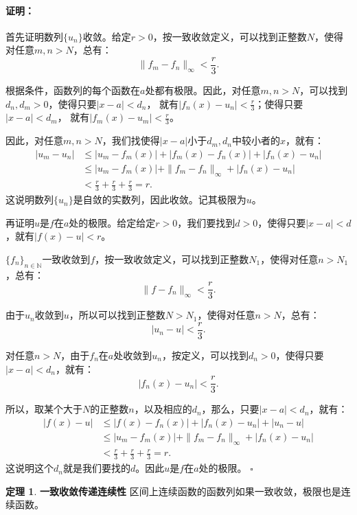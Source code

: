 \documentclass[12pt,UTF8]{ctexbook}
\theoremstyle{definition}
\newtheorem{tm}{定理}[section]
\theoremstyle{plain}
\renewenvironment{proof}{\paragraph{\textbf{证明：}}}{\hfill$\square$}
\begin{document}
\begin{appendix}
\begin{proof}
    首先证明数列$\{u_n\}$收敛。给定$r>0$，按一致收敛定义，可以找到正整数$N$，使得对任意$m,n>N$，总有：
    $$ \| f_m - f_n\|_{\infty} < \frac{r}{3}.$$

    根据条件，函数列的每个函数在$a$处都有极限。因此，对任意$m,n>N$，可以找到$d_n, d_m > 0$，使得只要$|x - a| < d_n$，
    就有$|f_n(x) - u_n| < \frac{r}{3}$；使得只要$|x - a| < d_m$，
    就有$|f_m(x) - u_m| < \frac{r}{3}$。

    因此，对任意$m,n>N$，我们找使得$|x - a|$小于$d_m, d_n$中较小者的$x$，就有：
    \begin{align*}
        |u_m - u_n| &\leqslant |u_m - f_m(x)| + |f_m(x) - f_n(x)| + |f_n(x) - u_n| \\
        &\leqslant |u_m - f_m(x)| + \| f_m - f_n\|_{\infty} + |f_n(x) - u_n| \\
        &< \frac{r}{3} + \frac{r}{3} + \frac{r}{3} = r.
    \end{align*}
    这说明数列$\{u_n\}$是自敛的实数列，因此收敛。记其极限为$u$。

    再证明$u$是$f$在$a$处的极限。给定给定$r>0$，我们要找到$d>0$，使得只要$|x - a| < d$，就有$|f(x) - u| < r$。
    
    $\{f_n\}_{n\in\mathbb{N}}$一致收敛到$f$，按一致收敛定义，可以找到正整数$N_1$，使得对任意$n>N_1$，总有：
    $$ \| f - f_n\|_{\infty} < \frac{r}{3}.$$

    由于$u_n$收敛到$u$，所以可以找到正整数$N>N_1$，使得对任意$n>N$，总有：
    $$ |u_n - u| < \frac{r}{3}.$$
    
    对任意$n>N$，由于$f_n$在$a$处收敛到$u_n$，按定义，可以找到$d_n > 0$，使得只要$|x - a| < d_n$，就有：
    $$ |f_n(x) - u_n| < \frac{r}{3}.$$

    所以，取某个大于$N$的正整数$n$，以及相应的$d_n$，那么，只要$|x - a| < d_n$，就有：
    \begin{align*}
        |f(x) - u| &\leqslant |f(x) - f_n(x)| + |f_n(x) - u_n| + |u_n - u| \\
        &\leqslant |u_m - f_m(x)| + \| f_m - f_n\|_{\infty} + |f_n(x) - u_n| \\
        &< \frac{r}{3} + \frac{r}{3} + \frac{r}{3} = r.
    \end{align*}
    这说明这个$d_n$就是我们要找的$d$。因此$u$是$f$在$a$处的极限。
\end{proof}

\begin{tm}{\textbf{一致收敛传递连续性}}
    区间上连续函数的函数列如果一致收敛，极限也是连续函数。
\end{tm}


\end{appendix}
\end{document}
